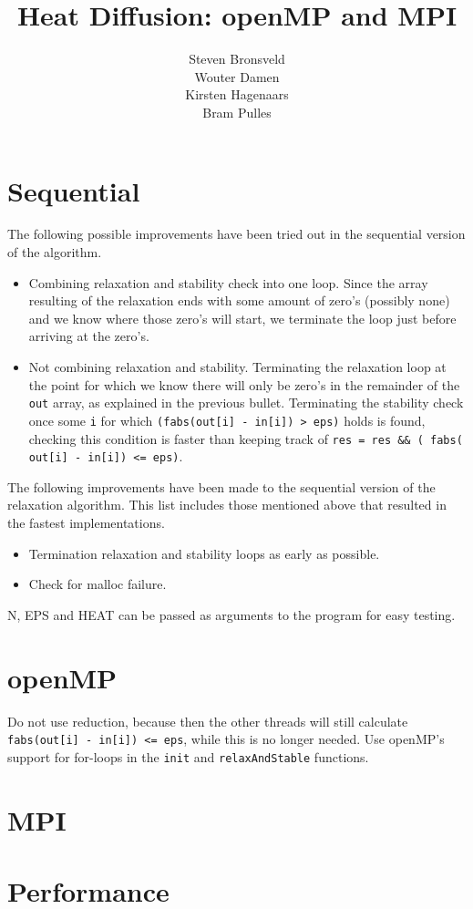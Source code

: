 \documentclass[a4paper]{article}
\author{Steven Bronsveld\\Wouter Damen\\Kirsten Hagenaars\\Bram Pulles}
\title{\textbf{Heat Diffusion: openMP and MPI}}
\begin{document}
\maketitle

\tableofcontents

\pagebreak
\section{Sequential}
The following possible improvements have been tried out in the sequential version of the algorithm.
\begin{itemize}
    \item Combining relaxation and stability check into one loop. Since the array resulting of the relaxation ends with some amount of zero's (possibly none) and we know where those zero's will start, we terminate the loop just before arriving at the zero's.
    \item Not combining relaxation and stability. Terminating the relaxation loop at the point for which we know there will only be zero's in the remainder of the \texttt{out} array, as explained in the previous bullet. Terminating the stability check once some \texttt{i} for which \texttt{(fabs(out[i] - in[i]) > eps)} holds is found, checking this condition is faster than keeping track of \texttt{res = res \&\& ( fabs( out[i] - in[i]) <= eps)}.
\end{itemize}
The following improvements have been made to the sequential version of the relaxation algorithm. This list includes those mentioned above that resulted in the fastest implementations.
\begin{itemize}
    \item Termination relaxation and stability loops as early as possible.
    \item Check for malloc failure.
\end{itemize}
N, EPS and HEAT can be passed as arguments to the program for easy testing.

\section{openMP}
Do not use reduction, because then the other threads will still calculate \texttt{fabs(out[i] - in[i]) <= eps}, while this is no longer needed. Use openMP's support for for-loops in the \texttt{init} and \texttt{relaxAndStable} functions.

\section{MPI}

\section{Performance}
\end{document}
